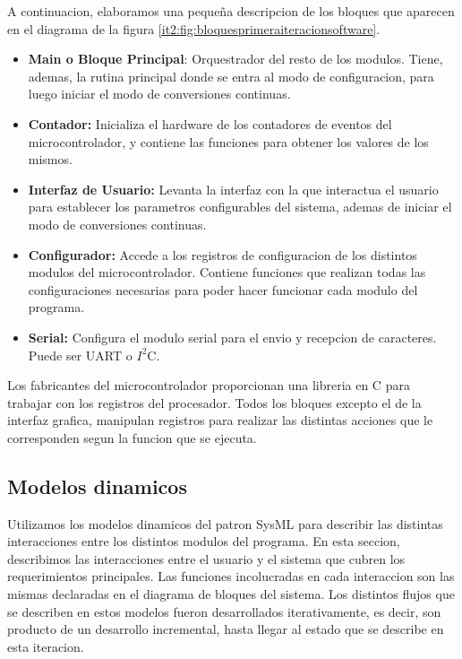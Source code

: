 A continuacion, elaboramos una pequeña descripcion de los bloques que aparecen en el diagrama de la figura \ref{it2:fig:bloquesprimeraiteracionsoftware}.

\begin{itemize}
  \item \textbf{Main o Bloque Principal}: Orquestrador del resto de los modulos. Tiene, ademas, la rutina principal donde se entra al modo de configuracion, para luego iniciar el modo de conversiones continuas.
  \item \textbf{Contador:} Inicializa el hardware de los contadores de eventos del microcontrolador, y contiene las funciones para obtener los valores de los mismos.
  \item \textbf{Interfaz de Usuario:} Levanta la interfaz con la que interactua el usuario para establecer los parametros configurables del sistema, ademas de iniciar el modo de conversiones continuas.
  \item \textbf{Configurador:} Accede a los registros de configuracion de los distintos modulos del microcontrolador. Contiene funciones que realizan todas las configuraciones necesarias para poder hacer funcionar cada modulo del programa.
  \item \textbf{Serial:} Configura el modulo serial para el envio y recepcion de caracteres. Puede ser UART o $I^{2}$C.
\end{itemize}


Los fabricantes del microcontrolador proporcionan una libreria en C para trabajar con los registros del procesador. Todos los bloques excepto el de la interfaz grafica, manipulan registros para realizar las distintas acciones que le corresponden segun la funcion que se ejecuta.  


\subsection{Modelos dinamicos} %
\label{it2:sub:modelos_dinamicos}

Utilizamos los modelos dinamicos del patron SysML para describir las distintas interacciones entre los distintos modulos del programa. En esta seccion, describimos las interacciones entre el usuario y el sistema que cubren los requerimientos principales. Las funciones incolucradas en cada interaccion son las mismas declaradas en el diagrama de bloques del sistema. Los distintos flujos que se describen en estos modelos fueron desarrollados iterativamente, es decir, son producto de un desarrollo incremental, hasta llegar al estado que se describe en esta iteracion. \\

